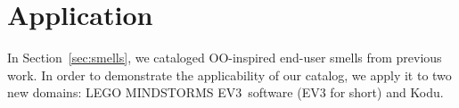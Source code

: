 \documentclass{sig-alternate}
\newcommand{\todo}[1]{\textbf{TODO: #1}}
\newcommand{\ms}{LEGO MINDSTORMS EV3}
\begin{document}






\section{Application}
\label{sec:application}
In Section~\ref{sec:smells}, we cataloged OO-inspired end-user smells from previous work. In order to demonstrate the applicability of our catalog, we apply it to two new domains: \ms~software (EV3 for short) and  Kodu. 
\end{document}
